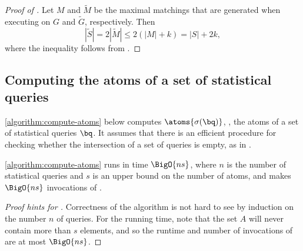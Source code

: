 
\begin{proof}[Proof of ]
	Let $M$ and $\widetilde{M}$ be the maximal matchings that are generated when executing  on $G$ and $\widetilde{G}$, respectively. 
	Then 
	\[
		|\widetilde{S}| = 2|\widetilde{M}| \leq 2(|M| + k) = |S| + 2k,
	\]
	where the inequality follows from .
\end{proof}

%
\subsection{Computing the atoms of a set of statistical queries} %
\label{section:compute-atoms}

\cref{algorithm:compute-atoms} below computes $\atoms{\sigma(\bq)}$, \ie, the atoms of a set of statistical queries $\bq$. It assumes that there is an efficient procedure {} for checking whether the intersection of a set of queries is empty, as in .

\cref{algorithm:compute-atoms} runs in time $\BigO{ns}$, where $n$ is the number of statistical queries and $s$ is an upper bound on the number of atoms, and makes $\BigO{ns}$ invocations of {}.

\begin{proof}[Proof hints for ] 
	Correctness of the algorithm is not hard to see by induction on the number $n$ of queries. For the running time, note that the set $A$ will never contain more than $s$ elements, and so the runtime and number of invocations of {} are at most $\BigO{ns}$.
\end{proof}

